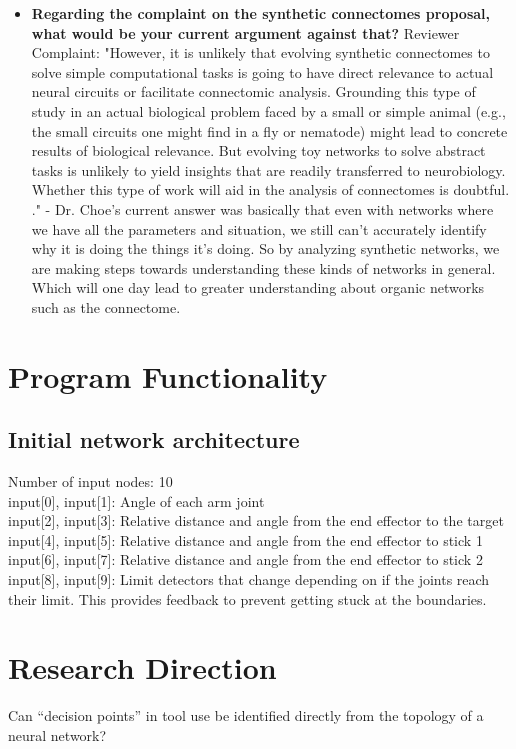 \documentclass{article}
\begin{document}
\begin{itemize}
    \item \textbf{Regarding the complaint on the synthetic connectomes proposal, what would be your current argument against that?}
        Reviewer Complaint: "However, it is unlikely that evolving synthetic connectomes to solve simple computational tasks is going to have direct relevance to actual neural circuits or facilitate connectomic analysis. Grounding this type of study in an actual biological problem faced by a small or simple animal (e.g., the small circuits one might find in a fly or nematode) might lead to concrete results of biological relevance. But evolving toy networks to solve abstract tasks is unlikely to yield insights that are readily transferred to neurobiology. Whether this type of work will aid in the analysis of connectomes is doubtful. ." - Dr. Choe's current answer was basically that even with networks where we have all the parameters and situation, we still can't accurately identify why it is doing the things it's doing. So by analyzing synthetic networks, we are making steps towards understanding these kinds of networks in general. Which will one day lead to greater understanding about organic networks such as the connectome.
\end{itemize}

\section{Program Functionality}
\subsection{Initial network architecture}
Number of input nodes: 10\\
input[0], input[1]: Angle of each arm joint\\
input[2], input[3]: Relative distance and angle from the end effector to the target\\
input[4], input[5]: Relative distance and angle from the end effector to stick 1\\
input[6], input[7]: Relative distance and angle from the end effector to stick 2\\
input[8], input[9]: Limit detectors that change depending on if the joints reach their limit. This provides feedback to prevent getting stuck at the boundaries.\\


\section{Research Direction}
Can “decision points” in tool use be identified directly from the topology of a neural network?
\end{document}
